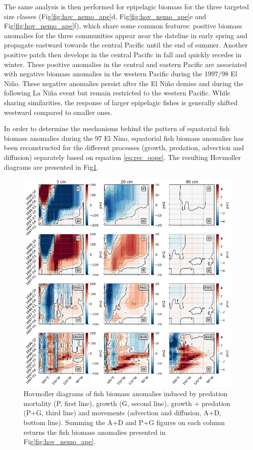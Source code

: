 The same analysis is then performed for epipelagic biomass for the three targeted size classes (Fig\ref{fig:hov_nemo_ape}d, Fig\ref{fig:hov_nemo_ape}e and Fig\ref{fig:hov_nemo_ape}f), which share some common features: positive biomass anomalies for the three communities appear near the dateline in early spring and propagate eastward towards the central Pacific until the end of summer. Another positive patch then develops in the central Pacific in fall and quickly recedes in winter. These positive anomalies in the central and eastern Pacific  are associated with negative biomass anomalies in the western Pacific during the 1997/98 El Niño. These negative anomalies persist after the El Niño demise and during the following La Niña event but remain restricted to the western Pacific. While sharing similarities, the response of larger epipelagic fishes is generally shifted westward compared to smaller ones.

In order to determine the mechanisms behind the pattern of equatorial fish biomass anomalies during the 97 El Nino, equatorial fish biomass anomalies has been reconstructed for the different processes (growth, predation, advection and diffusion) separately based on equation \ref{eq:rec_oope}. The resulting Hovmoller diagrams are presented in Fig\ref{fig:hov_ape_trends}.

\begin{figure}
	\centering
	\includegraphics[scale=0.4]{figs/hovmoller_anoms_oope_trends.png}	
	\caption{Hovmoller diagrams of fish biomass anomalies induced by predation mortality (P, first line), growth (G, second line), growth + predation (P+G, third line) and movements (advection and diffusion, A+D, bottom line). Summing the A+D and P+G figures on each column returns the fish biomass anomalies presented in Fig\ref{fig:hov_nemo_ape}.}	
	\label{fig:hov_ape_trends}
\end{figure}

